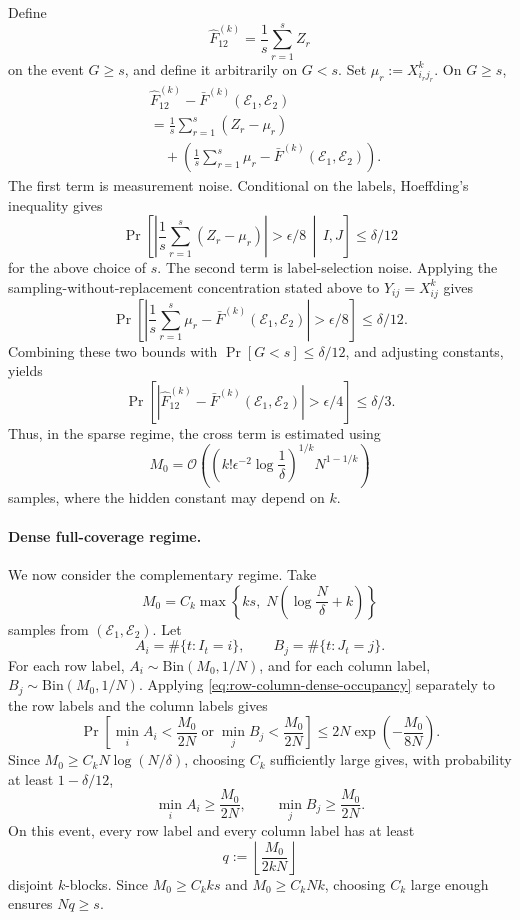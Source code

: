 \documentclass[aps,prx,reprint,superscriptaddress,amsmath,amssymb,longbibliography,floatfix]{revtex4-2}
\newcommand{\Abs}[1]{\left\lvert #1\right\rvert}
\newcommand{\scE}{\mathcal{E}}
\newcommand{\scO}{\mathcal{O}}
\theoremstyle{plain}
\theoremstyle{definition}
\theoremstyle{remark}
\begin{document}
Define
\begin{equation}
\widehat F_{12}^{(k)}=\frac1s\sum_{r=1}^s Z_r
\label{eq:app-across-label-frame-estimator}
\end{equation}
on the event $G\ge s$, and define it arbitrarily on $G<s$. Set $\mu_r:=X_{i_rj_r}^k$. On $G\ge s$,
\begin{equation}
\begin{aligned}
&\widehat F_{12}^{(k)}-\bar F^{(k)}(\scE_1,\scE_2)\\
&=
\frac1s\sum_{r=1}^s(Z_r-\mu_r)\\
&\quad+
\left(
\frac1s\sum_{r=1}^s\mu_r-\bar F^{(k)}(\scE_1,\scE_2)
\right).
\end{aligned}
\label{eq:app-across-label-error-decomposition}
\end{equation}
The first term is measurement noise. Conditional on the labels, Hoeffding's inequality gives
$$
\Pr\!\left[
\Abs{\frac1s\sum_{r=1}^s(Z_r-\mu_r)}>\epsilon/8\,\middle|\,I,J
\right]\le \delta/12
$$
for the above choice of $s$. The second term is label-selection noise. Applying the sampling-without-replacement concentration stated above to $Y_{ij}=X_{ij}^k$ gives
$$
\Pr\!\left[
\Abs{\frac1s\sum_{r=1}^s\mu_r-\bar F^{(k)}(\scE_1,\scE_2)}>\epsilon/8
\right]\le \delta/12.
$$
Combining these two bounds with $\Pr[G<s]\le\delta/12$, and adjusting constants, yields
\begin{equation}
\Pr\!\left[
\Abs{\widehat F_{12}^{(k)}-\bar F^{(k)}(\scE_1,\scE_2)}>\epsilon/4
\right]\le \delta/3.
\label{eq:app-across-label-frame-accuracy}
\end{equation}
Thus, in the sparse regime, the cross term is estimated using
$$
M_0=\scO\!\left(\left(k!\epsilon^{-2}\log\frac1\delta\right)^{1/k}N^{1-1/k}\right)
$$
samples, where the hidden constant may depend on $k$.

\paragraph*{Dense full-coverage regime.}
We now consider the complementary regime. Take
$$
M_0=C_k\max\left\{ks,\;N\left(\log\frac{N}{\delta}+k\right)\right\}
$$
samples from $(\scE_1,\scE_2)$. Let
$$
A_i=\#\{t:I_t=i\},\qquad B_j=\#\{t:J_t=j\}.
$$
For each row label, $A_i\sim \mathrm{Bin}(M_0,1/N)$, and for each column label, $B_j\sim \mathrm{Bin}(M_0,1/N)$. Applying \eqref{eq:row-column-dense-occupancy} separately to the row labels and the column labels gives
$$
\Pr\left[
\min_i A_i<\frac{M_0}{2N}
\;\text{or}\;
\min_j B_j<\frac{M_0}{2N}
\right]
\le
2N\exp\!\left(-\frac{M_0}{8N}\right).
$$
Since $M_0\ge C_kN\log(N/\delta)$, choosing $C_k$ sufficiently large gives, with probability at least $1-\delta/12$,
$$
\min_i A_i\ge \frac{M_0}{2N},\qquad
\min_j B_j\ge \frac{M_0}{2N}.
$$
On this event, every row label and every column label has at least
$$
q:=\left\lfloor \frac{M_0}{2kN}\right\rfloor
$$
disjoint $k$-blocks. Since $M_0\ge C_kks$ and $M_0\ge C_kNk$, choosing $C_k$ large enough ensures $Nq\ge s$.
\end{document}
